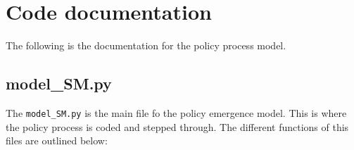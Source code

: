 \documentclass[11pt]{article}
\begin{document}


\section{Code documentation}

The following is the documentation for the policy process model.

\subsection{model\_SM.py}

The \texttt{model\_SM.py} is the main file fo the policy emergence model. This is where the policy process is coded and stepped through. The different functions of this files are outlined below:
\end{document}
